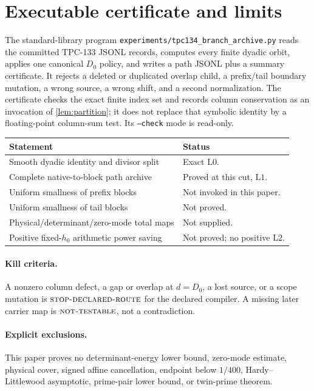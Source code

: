 \documentclass[11pt]{article}
\theoremstyle{definition}
\theoremstyle{remark}
\newcommand{\Lzero}{\mathrm{L0}}
\newcommand{\Lone}{\mathrm{L1}}
\newcommand{\Ltwo}{\mathrm{L2}}
\newcommand{\NT}{\textsc{not-testable}}
\newcommand{\STOP}{\textsc{stop-declared-route}}
\begin{document}
\section{Executable certificate and limits}

The standard-library program
\texttt{experiments/tpc134\_branch\_archive.py} reads the committed
TPC-133 JSONL records, computes every finite dyadic orbit, applies one
canonical \(D_0\) policy, and writes a path JSONL plus a summary
certificate.  It rejects a deleted or duplicated overlap child, a
prefix/tail boundary mutation, a wrong source, a wrong shift, and a
second normalization.  The certificate checks the exact finite index
set and records column conservation as an invocation of
\cref{lem:partition}; it does not replace that symbolic identity by a
floating-point column-sum test.  Its \texttt{--check} mode is
read-only.

\begin{center}
\small
\begin{tabularx}{\textwidth}{@{}P{0.43\textwidth}Y@{}}
\toprule
Statement & Status\\
\midrule
Smooth dyadic identity and divisor split
& Exact \(\Lzero\).\\
Complete native-to-block path archive
& Proved at this cut, \(\Lone\).\\
Uniform smallness of prefix blocks
& Not invoked in this paper.\\
Uniform smallness of tail blocks
& Not proved.\\
Physical/determinant/zero-mode total maps
& Not supplied.\\
Positive fixed-\(h_0\) arithmetic power saving
& Not proved; no positive \(\Ltwo\).\\
\bottomrule
\end{tabularx}
\end{center}

\paragraph{Kill criteria.}
A nonzero column defect, a gap or overlap at \(d=D_0\), a lost source,
or a scope mutation is \(\STOP\) for the declared compiler.  A missing
later carrier map is \(\NT\), not a contradiction.

\paragraph{Explicit exclusions.}
This paper proves no determinant-energy lower bound, zero-mode
estimate, physical cover, signed affine cancellation, endpoint below
\(1/400\), Hardy--Littlewood asymptotic, prime-pair lower bound, or
twin-prime theorem.

\begingroup
\small
\setlength{\bibsep}{2pt plus 0.3ex}


\endgroup
\end{document}
